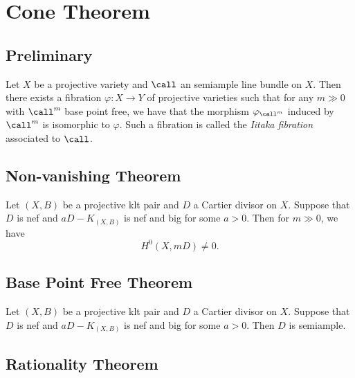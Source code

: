 \section{Cone Theorem}


\subsection{Preliminary}

    \begin{theorem}\label{thm: Iitaka fibration in semiample case}
        Let \(X\) be a projective variety and \(\call\) an semiample line bundle on \(X\).
        Then there exists a fibration \(\varphi: X \to Y\) of projective varieties 
        such that for any \(m\gg 0\) with \(\call^m\) base point free, we have that the morphism \(\varphi_{\call^m}\) induced by \(\call^m\) is isomorphic to \(\varphi\).
        Such a fibration is called the \emph{Iitaka fibration} associated to \(\call\).
    \end{theorem}

\subsection{Non-vanishing Theorem}

    \begin{theorem}\label{thm: non-vanishing theorem}
        Let \((X,B)\) be a projective klt pair and \(D\) a Cartier divisor on \(X\).
        Suppose that \(D\) is nef and \(aD-K_{(X,B)}\) is nef and big for some \(a > 0\).
        Then for \(m \gg 0\), we have 
        \[ H^0(X,mD) \neq 0. \]
    \end{theorem}

\subsection{Base Point Free Theorem}

    \begin{theorem}\label{thm: base point free theorem}
        Let \((X,B)\) be a projective klt pair and \(D\) a Cartier divisor on \(X\).
        Suppose that \(D\) is nef and \(aD-K_{(X,B)}\) is nef and big for some \(a > 0\).
        Then \(D\) is semiample.
    \end{theorem}

\subsection{Rationality Theorem}

